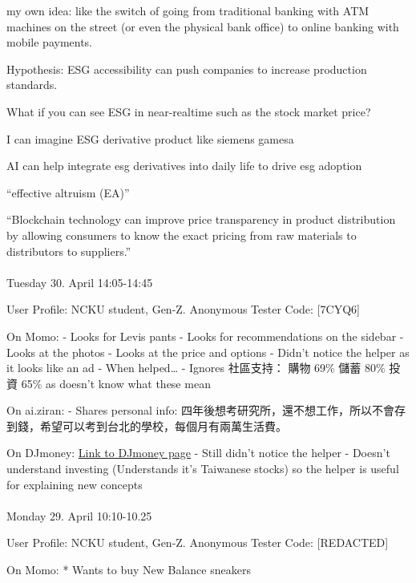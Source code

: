 \documentclass[
  12pt,
  letterpaper,
  DIV=11,
  numbers=noendperiod]{scrartcl}
\makeatletter
\let\oldparagraph\paragraph
\renewcommand{\paragraph}{
    \@ifstar
      \xxxParagraphStar
      \xxxParagraphNoStar
  }
\newcommand{\xxxParagraphStar}[1]{\oldparagraph*{#1}\mbox{}}
\newcommand{\xxxParagraphNoStar}[1]{\oldparagraph{#1}\mbox{}}
\makeatother
\begin{document}
my own idea: like the switch of going from traditional banking with ATM
machines on the street (or even the physical bank office) to online
banking with mobile payments.

Hypothesis: ESG accessibility can push companies to increase production
standards.

What if you can see ESG in near-realtime such as the stock market price?

I can imagine ESG derivative product like siemens gamesa

AI can help integrate esg derivatives into daily life to drive esg
adoption

``effective altruism (EA)''

``Blockchain technology can improve price transparency in product
distribution by allowing consumers to know the exact pricing from raw
materials to distributors to suppliers.''

\paragraph{Tuesday 30. April
14:05-14:45}\label{tuesday-30.-april-1405-1445}

User Profile: NCKU student, Gen-Z. Anonymous Tester Code: {[}7CYQ6{]}

On Momo: - Looks for Levis pants - Looks for recommendations on the
sidebar - Looks at the photos - Looks at the price and options - Didn't
notice the helper as it looks like an ad - When helped\ldots{} - Ignores
社區支持： 購物 69\% 儲蓄 80\% 投資 65\% as doesn't know what these mean

On ai.ziran: - Shares personal info:
四年後想考研究所，還不想工作，所以不會存到錢，希望可以考到台北的學校，每個月有兩萬生活費。

On DJmoney:
\href{https://www.moneydj.com/etf/x/basic/basic0004.xdjhtm?etfid=0050.tw}{Link
to DJmoney page} - Still didn't notice the helper - Doesn't understand
investing (Understands it's Taiwanese stocks) so the helper is useful
for explaining new concepts

\paragraph{Monday 29. April
10:10-10.25}\label{monday-29.-april-1010-10.25}

User Profile: NCKU student, Gen-Z. Anonymous Tester Code: {[}REDACTED{]}

On Momo: * Wants to buy New Balance sneakers
\end{document}
